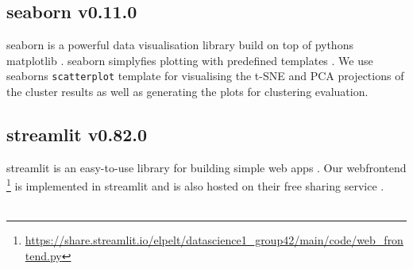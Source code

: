 \subsection[seaborn]{seaborn v0.11.0}
seaborn is a powerful data visualisation library build on top of pythons matplotlib \cite{Hunter:2007}. seaborn simplyfies plotting with predefined templates \cite{seaborn}. We use seaborns \texttt{scatterplot} template for visualising the t-SNE and PCA projections of the cluster results as well as generating the plots for clustering evaluation. 

\subsection[streamlit]{streamlit v0.82.0}
streamlit is an easy-to-use library for building simple web apps \cite{streamlit}. Our webfrontend \footnote{\href{https://share.streamlit.io/elpelt/datascience1_group42/main/code/web_frontend.py}{https://share.streamlit.io/elpelt/datascience1\_group42/main/code/web\_frontend.py}} is implemented in streamlit and is also hosted on their free sharing service .\\ 
\\

